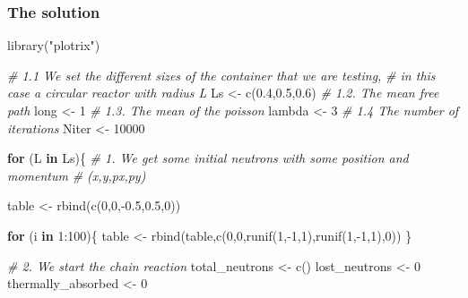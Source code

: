 \documentclass[11pt]{article}
\newenvironment{Shaded}{}{}
\newcommand{\DecValTok}[1]{\textcolor[rgb]{0.25,0.63,0.44}{{#1}}}
\newcommand{\FloatTok}[1]{\textcolor[rgb]{0.25,0.63,0.44}{{#1}}}
\newcommand{\StringTok}[1]{\textcolor[rgb]{0.25,0.44,0.63}{{#1}}}
\newcommand{\CommentTok}[1]{\textcolor[rgb]{0.38,0.63,0.69}{\textit{{#1}}}}
\newcommand{\OtherTok}[1]{\textcolor[rgb]{0.00,0.44,0.13}{{#1}}}
\newcommand{\FunctionTok}[1]{\textcolor[rgb]{0.02,0.16,0.49}{{#1}}}
\newcommand{\NormalTok}[1]{{#1}}
\newcommand{\SpecialCharTok}[1]{\textcolor[rgb]{0.25,0.44,0.63}{{#1}}}
\newcommand{\ControlFlowTok}[1]{\textcolor[rgb]{0.00,0.44,0.13}{\textbf{{#1}}}}
\begin{document}
\hypertarget{the-solution}{%
\subsubsection{\texorpdfstring{\textbf{The
solution}}{The solution}}\label{the-solution}}

\begin{Shaded}
\begin{Highlighting}[]
\FunctionTok{library}\NormalTok{(}\StringTok{"plotrix"}\NormalTok{)}

\CommentTok{\# 1.1 We set the different sizes of the container that we are testing,}
\CommentTok{\# in this case a circular reactor with radius L}
\NormalTok{Ls }\OtherTok{\textless{}{-}} \FunctionTok{c}\NormalTok{(}\FloatTok{0.4}\NormalTok{,}\FloatTok{0.5}\NormalTok{,}\FloatTok{0.6}\NormalTok{)}
\CommentTok{\# 1.2. The mean free path}
\NormalTok{long }\OtherTok{\textless{}{-}} \DecValTok{1}
\CommentTok{\# 1.3. The mean of the poisson}
\NormalTok{lambda }\OtherTok{\textless{}{-}} \DecValTok{3}
\CommentTok{\# 1.4 The number of iterations}
\NormalTok{Niter }\OtherTok{\textless{}{-}} \DecValTok{10000}

\ControlFlowTok{for}\NormalTok{ (L }\ControlFlowTok{in}\NormalTok{ Ls)\{}
        \CommentTok{\# 1. We get some initial neutrons with some position and momentum}
        \CommentTok{\# (x,y,px,py)}
        
\NormalTok{        table }\OtherTok{\textless{}{-}} \FunctionTok{rbind}\NormalTok{(}\FunctionTok{c}\NormalTok{(}\DecValTok{0}\NormalTok{,}\DecValTok{0}\NormalTok{,}\SpecialCharTok{{-}}\FloatTok{0.5}\NormalTok{,}\FloatTok{0.5}\NormalTok{,}\DecValTok{0}\NormalTok{))}
        
        \ControlFlowTok{for}\NormalTok{ (i }\ControlFlowTok{in} \DecValTok{1}\SpecialCharTok{:}\DecValTok{100}\NormalTok{)\{}
\NormalTok{            table }\OtherTok{\textless{}{-}} \FunctionTok{rbind}\NormalTok{(table,}\FunctionTok{c}\NormalTok{(}\DecValTok{0}\NormalTok{,}\DecValTok{0}\NormalTok{,}\FunctionTok{runif}\NormalTok{(}\DecValTok{1}\NormalTok{,}\SpecialCharTok{{-}}\DecValTok{1}\NormalTok{,}\DecValTok{1}\NormalTok{),}\FunctionTok{runif}\NormalTok{(}\DecValTok{1}\NormalTok{,}\SpecialCharTok{{-}}\DecValTok{1}\NormalTok{,}\DecValTok{1}\NormalTok{),}\DecValTok{0}\NormalTok{))}
\NormalTok{            \}}
    
        \CommentTok{\# 2. We start the chain reaction}
\NormalTok{        total\_neutrons }\OtherTok{\textless{}{-}} \FunctionTok{c}\NormalTok{()}
\NormalTok{        lost\_neutrons }\OtherTok{\textless{}{-}} \DecValTok{0}
\NormalTok{        thermally\_absorbed }\OtherTok{\textless{}{-}} \DecValTok{0}
    

\end{Highlighting}
\end{Shaded}
\end{document}
